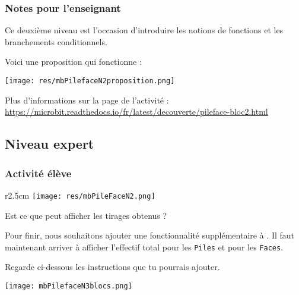 \newpage
\subsubsection{Notes pour l'enseignant}

Ce deuxième niveau est l'occasion d'introduire les notions de fonctions et les branchements conditionnels.

\begin{methode}
Voici une proposition qui fonctionne :

\texttt{[image: res/mbPilefaceN2proposition.png]}
\end{methode}

\begin{remarque}
Plus d'informations sur la page de l'activité :\\ \url{https://microbit.readthedocs.io/fr/latest/decouverte/pileface-bloc2.html}
\end{remarque}





%
%
\newpage
\subsection{Niveau expert}
\subsubsection{Activité élève}



\begin{wrapfigure}[4]{r}{2.5cm}
    \texttt{[image: res/mbPileFaceN2.png]}
\end{wrapfigure}
\begin{eleve}
Est ce que \mb peut afficher les tirages obtenus ?

Pour finir, nous souhaitons ajouter une fonctionnalité supplémentaire à \mb. Il faut maintenant arriver à afficher l'effectif total pour les \texttt{Piles} et pour les \texttt{Faces}.

Regarde ci-dessous les instructions que tu pourrais ajouter.

\centerline{\texttt{[image: mbPilefaceN3blocs.png]}}
\end{eleve}



